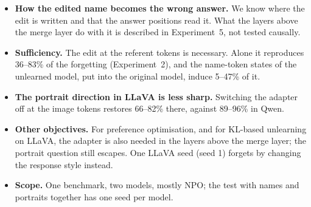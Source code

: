 \documentclass[11pt]{article}
\begin{document}
\begin{itemize}
\item \textbf{How the edited name becomes the wrong answer.} We know where the edit is written
and that the answer positions read it. What the layers above the merge layer do with it is
described in Experiment~5, not tested causally.
\item \textbf{Sufficiency.} The edit at the referent tokens is necessary. Alone it reproduces
36--83\% of the forgetting (Experiment~2), and the name-token states of the unlearned model,
put into the original model, induce 5--47\% of it.
\item \textbf{The portrait direction in LLaVA is less sharp.} Switching the adapter off at the
image tokens restores 66--82\% there, against 89--96\% in Qwen.
\item \textbf{Other objectives.} For preference optimisation, and for KL-based unlearning on
LLaVA, the adapter is also needed in the layers above the merge layer; the portrait question
still escapes. One LLaVA seed (seed 1) forgets by changing the response style instead.
\item \textbf{Scope.} One benchmark, two models, mostly NPO; the test with names and portraits
together has one seed per model.
\end{itemize}
\end{document}
